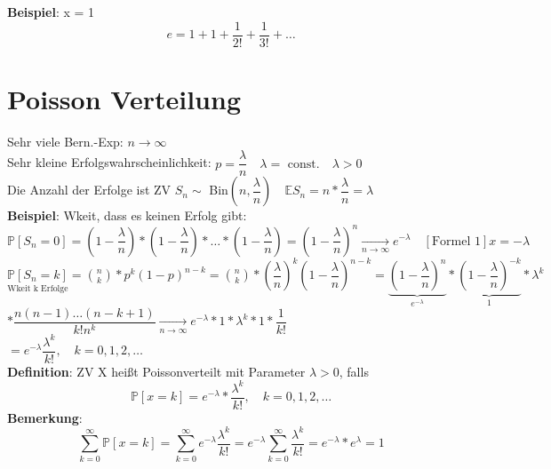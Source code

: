 \textbf{Beispiel}: x = 1
$$e = 1+1+\dfrac{1}{2!}+\dfrac{1}{3!}+\dots$$
\section{Poisson Verteilung}
\newcommand{\ntoinf}{\underset{n\rightarrow\infty}{\rightarrow}}
Sehr viele Bern.-Exp: $n\rightarrow \infty$\\
Sehr kleine Erfolgswahrscheinlichkeit: $p=\dfrac{\lambda}{n} \quad \lambda =\text{ const.}\quad \lambda >0$\smallskip\\
Die Anzahl der Erfolge ist ZV $S_n \sim$ Bin$(n,\dfrac{\lambda}{n}) \quad \mathds{E}S_n = n*\dfrac{\lambda}{n}=\lambda$\medskip\\
\textbf{Beispiel}: Wkeit, dass es keinen Erfolg gibt: $\mathds{P}[S_n = 0] = (1-\dfrac{\lambda}{n})*(1-\dfrac{\lambda}{n})*\dots*(1-\dfrac{\lambda}{n}) = (1-\dfrac{\lambda}{n})^n \ntoinf e^{-\lambda} \quad [\text{Formel 1}] x = -\lambda$\medskip\\
$\underset{\text{Wkeit k Erfolge}}{\mathds{P}[S_n=k]} = \binom{n}{k}*p^k(1-p)^{n-k} = \binom{n}{k}*(\dfrac{\lambda}{n})^k(1-\dfrac{\lambda}{n})^{n-k} = \underbrace{(1-\dfrac{\lambda}{n})^n}_{e^{-\lambda}}*\underbrace{(1-\dfrac{\lambda}{n})^{-k}}_1 *\lambda^k$\medskip\\
$*\dfrac{n(n-1)\dots(n-k+1)}{k!n^k}\ntoinf e^{-\lambda}*1*\lambda^k*1*\dfrac{1}{k!}$\smallskip\\
$=e^{-\lambda}\dfrac{\lambda^k}{k!}, \quad k = 0,1,2,\dots$\medskip\\
\textbf{Definition}: ZV X heißt Poissonverteilt mit Parameter $\lambda >0$, falls 
$$\mathds{P}[x=k]=e^{-\lambda}*\dfrac{\lambda^k}{k!}, \quad k=0,1,2,\dots$$
\textbf{Bemerkung}:
$$\sum_{k=0}^\infty \mathds{P}[x=k]=\sum_{k=0}^\infty e^{-\lambda}\dfrac{\lambda^k}{k!}=e^{-\lambda} \sum_{k=0}^\infty \dfrac{\lambda^k}{k!}=e^{-\lambda}*e^\lambda = 1$$
